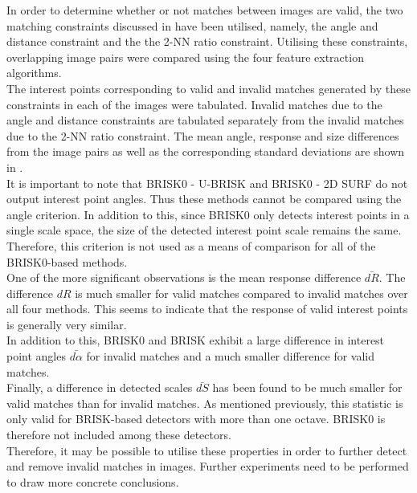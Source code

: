 In order to determine whether or not matches between images are valid, the two matching constraints discussed in  have been utilised, namely, the angle and distance constraint and the the 2-NN ratio constraint. Utilising these constraints, overlapping image pairs were compared using the four feature extraction algorithms. \\

The interest points corresponding to valid and invalid matches generated by these constraints in each of the images were tabulated. Invalid matches due to the angle and distance constraints are tabulated separately from the invalid matches due to the 2-NN ratio constraint. The mean angle, response and size differences from the image pairs as well as the corresponding standard deviations are shown in .\\

It is important to note that BRISK0 - U-BRISK and BRISK0 - 2D SURF do not output interest point angles. Thus these methods cannot be compared using the angle criterion. In addition to this, since BRISK0 only detects interest points in a single scale space, the size of the detected interest point scale remains the same. Therefore, this criterion is not used as a means of comparison for all of the BRISK0-based methods.\\

One of the more significant observations is the mean response difference $\bar{dR}$. The difference $dR$ is much smaller for valid matches compared to invalid matches over all four methods. This seems to indicate that the response of valid interest points is generally very similar.\\

In addition to this, BRISK0 and BRISK exhibit a large difference in interest point angles $\bar{d\alpha}$ for invalid matches and a much smaller difference for valid matches. \\

Finally, a difference in detected scales $\bar{dS}$ has been found to be much smaller for valid matches than for invalid matches. As mentioned previously, this statistic is only valid for BRISK-based detectors with more than one octave. BRISK0 is therefore not included among these detectors.\\

Therefore, it may be possible to utilise these properties in order to further detect and remove invalid matches in images. Further experiments need to be performed to draw more concrete conclusions.\\

